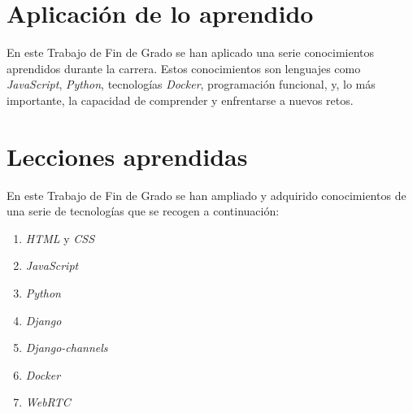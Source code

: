 \documentclass[a4paper, 12pt]{book}
\begin{document}
\section{Aplicación de lo aprendido}
\label{sec:aplicacion}

En este Trabajo de Fin de Grado se han aplicado una serie conocimientos aprendidos durante la carrera. Estos conocimientos son lenguajes como \emph{JavaScript}, \emph{Python}, tecnologías \emph{Docker}, programación funcional, y, lo más importante, la capacidad de comprender y enfrentarse a nuevos retos.


\section{Lecciones aprendidas}
\label{sec:lecciones_aprendidas}

En este Trabajo de Fin de Grado se han ampliado y adquirido conocimientos de una serie de tecnologías que se recogen a continuación:

\begin{enumerate}
  \item \emph{HTML} y \emph{CSS}
  \item \emph{JavaScript}
  \item \emph{Python}
  \item \emph{Django}
  \item \emph{Django-channels}
  \item \emph{Docker}
  \item \emph{WebRTC}
\end{enumerate}







\end{document}

